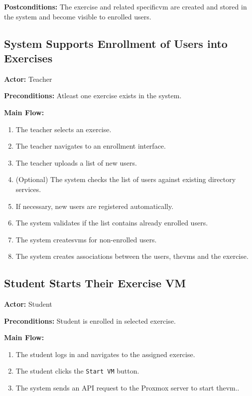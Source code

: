         \textbf{Postconditions:} The exercise and related specific\ac{vm} are created and stored in the system and 
        become visible to enrolled users.

    \subsection{System Supports Enrollment of Users into Exercises}
        \textbf{Actor:} Teacher

        \textbf{Preconditions:} Atleast one exercise exists in the system.

        \textbf{Main Flow:}
        \begin{enumerate}
            \item The teacher selects an exercise.
            \item The teacher navigates to an enrollment interface.
            \item The teacher uploads a list of new users.
            \item (Optional) The system checks the list of users against existing directory services.
            \item If necessary, new users are registered automatically.
            \item The system validates if the list contains already enrolled users.
            \item The system creates\ac{vm}s for non-enrolled users.
            \item The system creates associations between the users, the\ac{vm}s and the exercise.
        \end{enumerate}

    \subsection{Student Starts Their Exercise VM}
        \textbf{Actor:} Student

        \textbf{Preconditions:} Student is enrolled in selected exercise.

        \textbf{Main Flow:}
        \begin{enumerate}
            \item The student logs in and navigates to the assigned exercise.
            \item The student clicks the \texttt{Start VM} button.
            \item The system sends an API request to the Proxmox server to start the\ac{vm}..
        \end{enumerate}

